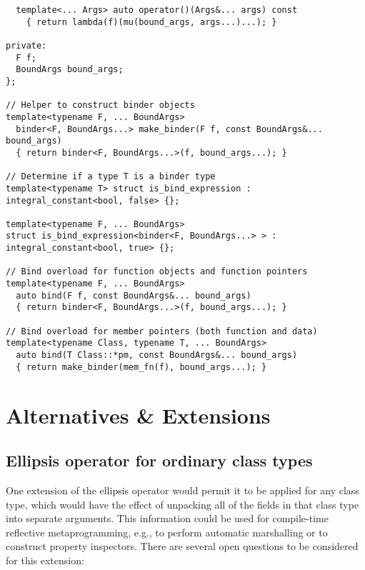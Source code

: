 \documentclass{article}
\begin{document}
\begin{verbatim}
  template<... Args> auto operator()(Args&... args) const
    { return lambda(f)(mu(bound_args, args...)...); }

private:
  F f;
  BoundArgs bound_args;
};

// Helper to construct binder objects
template<typename F, ... BoundArgs>
  binder<F, BoundArgs...> make_binder(F f, const BoundArgs&... bound_args)
  { return binder<F, BoundArgs...>(f, bound_args...); }

// Determine if a type T is a binder type
template<typename T> struct is_bind_expression : integral_constant<bool, false> {};

template<typename F, ... BoundArgs>
struct is_bind_expression<binder<F, BoundArgs...> > : integral_constant<bool, true> {};

// Bind overload for function objects and function pointers
template<typename F, ... BoundArgs>
  auto bind(F f, const BoundArgs&... bound_args)
  { return binder<F, BoundArgs...>(f, bound_args...); }

// Bind overload for member pointers (both function and data)
template<typename Class, typename T, ... BoundArgs>
  auto bind(T Class::*pm, const BoundArgs&... bound_args)
  { return make_binder(mem_fn(f), bound_args...); }
\end{verbatim}
\normalsize

\section{Alternatives \& Extensions}
\subsection{Ellipsis operator for ordinary class types}
One extension of the ellipsis operator would permit it to be applied
for any class type, which would have the effect of unpacking all of
the fields in that class type into separate arguments. This
information could be used for compile-time reflective metaprogramming,
e.g., to perform automatic marshalling or to construct property
inspectors. There are several open questions to be considered for this
extension:
\end{document}
